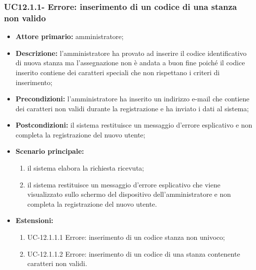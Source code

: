 \subsubsection{UC12.1.1- Errore: inserimento di un codice di una stanza non valido}
\begin{itemize}
	\item \textbf{Attore primario:} amministratore;
	\item \textbf{Descrizione:} l'amministratore ha provato ad inserire il codice identificativo di nuova stanza ma l'assegnazione non è andata a buon fine poiché il codice inserito contiene dei caratteri speciali che non rispettano i criteri di inserimento;
	\item \textbf{Precondizioni:} l'amministratore ha inserito un indirizzo e-mail che contiene dei caratteri non validi durante la registrazione e ha inviato i dati al sistema;
	\item \textbf{Postcondizioni:} il sistema restituisce un messaggio d'errore esplicativo e non completa la registrazione del nuovo utente;
	\item \textbf{Scenario principale:}
	      \begin{enumerate}
		      \item il sistema elabora la richiesta ricevuta;
		      \item il sistema restituisce un messaggio d'errore esplicativo che viene visualizzato sullo schermo del dispositivo dell'amministratore e non completa la registrazione del nuovo utente.
	      \end{enumerate}
	 \item \textbf{Estensioni:}
	 	\begin{enumerate}
		       \item UC-12.1.1.1 Errore: inserimento di un codice stanza non univoco;
		       \item UC-12.1.1.2 Errore: inserimento di un codice di una stanza contenente caratteri non validi.
	        \end{enumerate}
\end{itemize}

